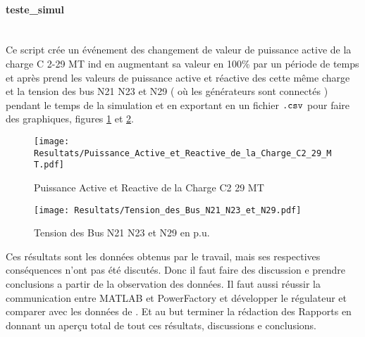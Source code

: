 \documentclass[a4paper,twoside]{article}
\begin{document}
\paragraph{teste\_simul\\\\}
Ce script crée un événement des changement de valeur de puissance active de la charge C 2-29 MT ind en augmentant sa valeur en 100\% par un période de temps et après prend les valeurs de puissance active et réactive des cette même charge et la tension des bus N21 N23 et N29 ( où les générateurs sont connectés ) pendant le temps de la simulation et en exportant en un fichier $ \verb|.csv| $ pour faire des graphiques, figures \ref{fig:Puissance_Active_et_Reactive_de_la_Charge_C2_29_MT} et \ref{fig:Tension_des_Bus_N21_N23_et_N29}.
\begin{figure}[H]
	\begin{center}	
		\texttt{[image: Resultats/Puissance\_Active\_et\_Reactive\_de\_la\_Charge\_C2\_29\_MT.pdf]}
		\caption{Puissance Active et Reactive de la Charge C2 29 MT}
		\label{fig:Puissance_Active_et_Reactive_de_la_Charge_C2_29_MT}
	\end{center}
\end{figure}

\begin{figure}[H]
	\begin{center}	
		\texttt{[image: Resultats/Tension\_des\_Bus\_N21\_N23\_et\_N29.pdf]}
		\caption{Tension des Bus N21 N23 et N29 en p.u.}
		\label{fig:Tension_des_Bus_N21_N23_et_N29}
	\end{center}
\end{figure}

Ces résultats sont les données obtenus par le travail, mais ses respectives conséquences n'ont pas été discutés. Donc il faut faire des discussion e prendre conclusions a partir de la observation des données. Il faut aussi réussir la communication entre MATLAB et PowerFactory et développer le régulateur et comparer avec les données de \cite{cosson:tel-01374469}. Et au but terminer la rédaction des Rapports en donnant un aperçu total de tout ces résultats, discussions e conclusions.





\end{document}
